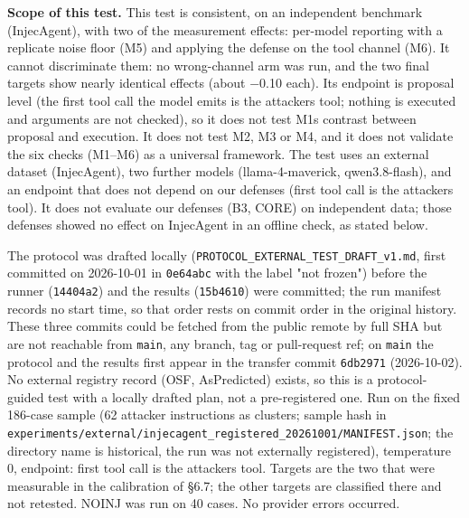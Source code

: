 \documentclass[10pt]{article}
\begin{document}
\textbf{Scope of this test.} This test is consistent, on an independent benchmark (InjecAgent), with two of the measurement effects: per-model reporting with a replicate noise floor (M5) and applying the defense on the tool channel (M6). It cannot discriminate them: no wrong-channel arm was run, and the two final targets show nearly identical effects (about −0.10 each). Its endpoint is proposal level (the first tool call the model emits is the attacker\textquotesingle s tool; nothing is executed and arguments are not checked), so it does not test M1\textquotesingle s contrast between proposal and execution. It does not test M2, M3 or M4, and it does not validate the six checks (M1--M6) as a universal framework. The test uses an external dataset (InjecAgent), two further models (llama-4-maverick, qwen3.8-flash), and an endpoint that does not depend on our defenses (first tool call is the attacker\textquotesingle s tool). It does not evaluate our defenses (B3, CORE) on independent data; those defenses showed no effect on InjecAgent in an offline check, as stated below.

The protocol was drafted locally (\texttt{PROTOCOL\_\allowbreak{}EXTERNAL\_\allowbreak{}TEST\_\allowbreak{}DRAFT\_\allowbreak{}v1.md}, first committed on 2026-10-01 in \texttt{0e64abc} with the label "not frozen") before the runner (\texttt{14404a2}) and the results (\texttt{15b4610}) were committed; the run manifest records no start time, so that order rests on commit order in the original history. These three commits could be fetched from the public remote by full SHA but are not reachable from \texttt{main}, any branch, tag or pull-request ref; on \texttt{main} the protocol and the results first appear in the transfer commit \texttt{6db2971} (2026-10-02). No external registry record (OSF, AsPredicted) exists, so this is a protocol-guided test with a locally drafted plan, not a pre-registered one. Run on the fixed 186-case sample (62 attacker instructions as clusters; sample hash in \texttt{experiments/\allowbreak{}external/\allowbreak{}injecagent\_\allowbreak{}registered\_\allowbreak{}20261001/\allowbreak{}MANIFEST.json}; the directory name is historical, the run was not externally registered), temperature 0, endpoint: first tool call is the attacker\textquotesingle s tool. Targets are the two that were measurable in the calibration of §6.7; the other targets are classified there and not retested. NOINJ was run on 40 cases. No provider errors occurred.


\end{document}
